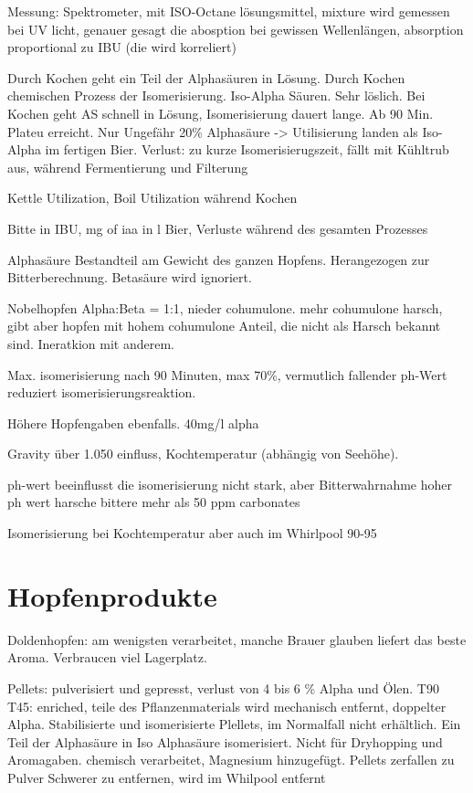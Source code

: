 \documentclass[a4paper,parskip=half]{scrartcl}
\begin{document}
Messung: Spektrometer, mit ISO-Octane lösungsmittel, mixture
wird gemessen bei UV licht, genauer gesagt die abosption
bei gewissen Wellenlängen, absorption proportional
zu IBU (die wird korreliert)

\parencite[12]{Garetz1994}
Durch Kochen geht ein Teil der Alphasäuren in Lösung. Durch Kochen
chemischen Prozess der Isomerisierung. Iso-Alpha Säuren. Sehr löslich.
Bei Kochen geht AS schnell in Lösung, Isomerisierung dauert lange.
Ab 90 Min. Plateu erreicht.
Nur Ungefähr 20\% Alphasäure -> Utilisierung landen als Iso-Alpha im
fertigen Bier.
Verlust: zu kurze Isomerisierugszeit, fällt mit Kühltrub aus,
während Fermentierung und Filterung

\parencite[13]{Garetz1994}
Kettle Utilization, Boil Utilization während Kochen

\parencite[14]{Garetz1994} 
Bitte in IBU, mg of iaa in l Bier, Verluste während des gesamten
Prozesses

\parencite[34]{Garetz1994}
Alphasäure Bestandteil am Gewicht des ganzen Hopfens. Herangezogen
zur Bitterberechnung. Betasäure wird ignoriert.

\parencite[35]{Garetz1994}
Nobelhopfen Alpha:Beta = 1:1, nieder cohumulone.
mehr cohumulone harsch, gibt aber hopfen mit hohem cohumulone
Anteil, die nicht als Harsch bekannt sind. Ineratkion
mit anderem.

\parencite[128]{Garetz1994} 
Max. isomerisierung nach 90 Minuten, max 70\%, vermutlich fallender
ph-Wert reduziert isomerisierungsreaktion.

Höhere Hopfengaben ebenfalls. 40mg/l alpha 

\parencite[129]{Garetz1994} 
Gravity über 1.050 einfluss, Kochtemperatur (abhängig von Seehöhe).


\parencite[78]{Daniels1996}
ph-wert beeinflusst die isomerisierung nicht stark, aber Bitterwahrnahme
hoher ph wert harsche bittere mehr als 50 ppm carbonates

\parencite[49]{Holle2010} Isomerisierung bei Kochtemperatur
aber auch im Whirlpool 90-95


\section*{Hopfenprodukte}

\parencite[80\psq]{Garetz1994}
Doldenhopfen: am wenigsten verarbeitet, manche Brauer glauben
liefert das beste Aroma. Verbraucen viel Lagerplatz.

\parencite[82\psqq]{Garetz1994}
Pellets: pulverisiert und gepresst, verlust von 4 bis 6 \% Alpha
und Ölen.
T90
T45: enriched, teile des Pflanzenmaterials wird mechanisch
entfernt, doppelter Alpha.
Stabilisierte und isomerisierte Plellets, im Normalfall nicht
erhältlich. Ein Teil der Alphasäure in Iso Alphasäure
isomerisiert. Nicht für Dryhopping und Aromagaben.
chemisch verarbeitet, Magnesium hinzugefügt.
Pellets zerfallen zu Pulver
Schwerer zu entfernen, wird im Whilpool entfernt \parencite[87]{Garetz1994}
\end{document}

